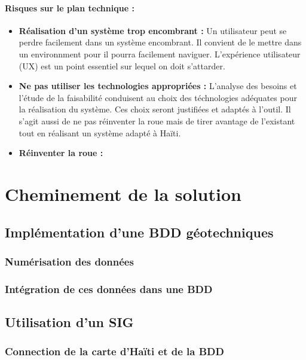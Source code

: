         \paragraph{Risques sur le plan technique :}
        \begin{itemize}
            \item \textbf{Réalisation d'un système trop encombrant :}
            Un utilisateur peut se perdre facilement dans un système encombrant. Il convient de le mettre dans un environnment
            pour il pourra facilement naviguer. L'expérience utilisateur (UX) est un point essentiel sur lequel on doit s'attarder.
            \item \textbf{Ne pas utiliser les technologies appropriées :}
            L'analyse des besoins et l'étude de la faisabilité conduisent au choix des téchnologies adéquates pour la réalisation
            du système. Ces choix seront justifiées et adaptés à l'outil. 
            Il s'agit aussi de ne pas réinventer la roue mais de tirer avantage de l'existant tout en réalisant 
            un système adapté à Haïti.
            \item \textbf{Réinventer la roue :}
        \end{itemize}


    \section{Cheminement de la solution}
        \subsection{Implémentation d'une BDD géotechniques}
            \subsubsection{Numérisation des données}
                
            \subsubsection{Intégration de ces données dans une BDD}
                
        \subsection{Utilisation d'un SIG}
            \subsubsection{Connection de la carte d'Haïti et de la BDD}
                
